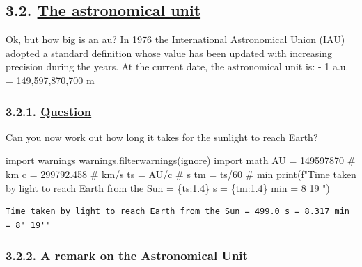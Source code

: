 \documentclass[
  letterpaper,
  DIV=11,
  numbers=noendperiod]{scrartcl}
\newenvironment{Shaded}{\begin{snugshade}}{\end{snugshade}}
\newcommand{\BuiltInTok}[1]{\textcolor[rgb]{0.00,0.23,0.31}{#1}}
\newcommand{\CommentTok}[1]{\textcolor[rgb]{0.37,0.37,0.37}{#1}}
\newcommand{\DecValTok}[1]{\textcolor[rgb]{0.68,0.00,0.00}{#1}}
\newcommand{\FloatTok}[1]{\textcolor[rgb]{0.68,0.00,0.00}{#1}}
\newcommand{\ImportTok}[1]{\textcolor[rgb]{0.00,0.46,0.62}{#1}}
\newcommand{\NormalTok}[1]{\textcolor[rgb]{0.00,0.23,0.31}{#1}}
\newcommand{\OperatorTok}[1]{\textcolor[rgb]{0.37,0.37,0.37}{#1}}
\newcommand{\SpecialCharTok}[1]{\textcolor[rgb]{0.37,0.37,0.37}{#1}}
\newcommand{\SpecialStringTok}[1]{\textcolor[rgb]{0.13,0.47,0.30}{#1}}
\newcommand{\StringTok}[1]{\textcolor[rgb]{0.13,0.47,0.30}{#1}}
\begin{document}
\hypertarget{the-astronomical-unit}{%
\subsection{\texorpdfstring{3.2. \protect\hyperlink{toc0_}{The
astronomical
unit}}{3.2. The astronomical unit}}\label{the-astronomical-unit}}

Ok, but how big is an au? In 1976 the International Astronomical Union
(IAU) adopted a standard definition whose value has been updated with
increasing precision during the years. At the current date, the
astronomical unit is: - 1 a.u. = 149,597,870,700 m

\hypertarget{question}{%
\subsubsection{\texorpdfstring{3.2.1.
\protect\hyperlink{toc0_}{Question}}{3.2.1. Question}}\label{question}}

Can you now work out how long it takes for the sunlight to reach Earth?

\begin{Shaded}
\begin{Highlighting}[]
\ImportTok{import}\NormalTok{ warnings}
\NormalTok{warnings.filterwarnings(}\StringTok{\textquotesingle{}ignore\textquotesingle{}}\NormalTok{)}
\ImportTok{import}\NormalTok{ math}
\NormalTok{AU }\OperatorTok{=} \DecValTok{149597870} \CommentTok{\# km}
\NormalTok{c }\OperatorTok{=} \FloatTok{299792.458} \CommentTok{\# km/s}
\NormalTok{ts }\OperatorTok{=}\NormalTok{ AU}\OperatorTok{/}\NormalTok{c }\CommentTok{\# s}
\NormalTok{tm }\OperatorTok{=}\NormalTok{ ts}\OperatorTok{/}\DecValTok{60} \CommentTok{\# min}
\BuiltInTok{print}\NormalTok{(}\SpecialStringTok{f"Time taken by light to reach Earth from the Sun = }\SpecialCharTok{\{}\NormalTok{ts}\SpecialCharTok{:1.4\}}\SpecialStringTok{ s = }\SpecialCharTok{\{}\NormalTok{tm}\SpecialCharTok{:1.4\}}\SpecialStringTok{ min = 8\textquotesingle{} 19\textquotesingle{}\textquotesingle{} "}\NormalTok{)}
\end{Highlighting}
\end{Shaded}

\begin{verbatim}
Time taken by light to reach Earth from the Sun = 499.0 s = 8.317 min = 8' 19'' 
\end{verbatim}

\hypertarget{a-remark-on-the-astronomical-unit}{%
\subsubsection{\texorpdfstring{3.2.2. \protect\hyperlink{toc0_}{A remark
on the Astronomical
Unit}}{3.2.2. A remark on the Astronomical Unit}}\label{a-remark-on-the-astronomical-unit}}
\end{document}
